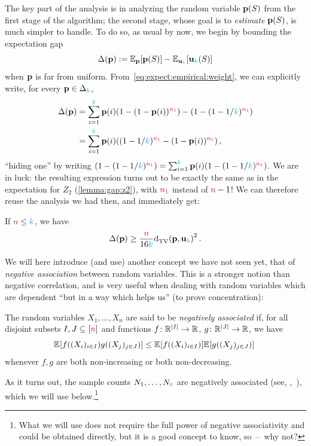 The key part of the analysis is in analyzing the random variable $\mathbf{p}(S)$ from the first stage of the algorithm; the second stage, whose goal is to \emph{estimate} $\mathbf{p}(S)$, is much simpler to handle. To do so, as usual by now, we begin by bounding the expectation gap
\begin{equation}
    \Delta(\p) \eqdef \bE{\p}{\p(S)} - \bE{\uniform_\ab}{\uniform_\ab(S)}
\end{equation}
when $\mathbf{p}$ is far from uniform. From~\cref{eq:expect:empirical:weight}, we can explicitly write, for every $\mathbf{p}\in\Delta_{{\textcolor{cyan}{k}}}$,
\begin{align*}
  \Delta(\p) 
  &= \sum_{i=1}^\ab \p(i) (1-(1-\p(i))^{\nss}) - \Paren{1-(1-1/\ab)^{\nss}} \\
  &= \sum_{i=1}^\ab \p(i) \Paren{ (1-1/\ab)^{\nss} - (1-\p(i))^{\nss} }\,,
\end{align*}
``hiding one'' by writing $\Paren{1-(1-1/\ab)^{\nss}} = \sum_{i=1}^\ab \p(i)\Paren{1-(1-1/\ab)^{\nss}}$. We are in luck: the resulting expression turns out to be exactly the same as in the expectation for $Z_2$ (\cref{lemma:gap:z2}), with $\textcolor{red}{{\textcolor{purple}{n}}_1}$ instead of ${\textcolor{purple}{n}}-1$! We can therefore reuse the analysis we had then, and immediately get:
\begin{lemma}
  \label{lemma:gap:z7}
If ${\textcolor{purple}{n}} \leq {\textcolor{cyan}{k}}$, we have
\[
    \Delta(\p) \geq \frac{\ns}{16\ab}\totalvardist{\p}{\uniform_\ab}^2\,.
\]
\end{lemma}
We will here introduce (and use) another concept we have not seen yet, that of \emph{negative association} between random variables. This is a stronger notion than negative correlation, and is very useful when dealing with random variables which are dependent ``but in a way which helps us'' (to prove concentration):
\begin{definition}
The random variables $X_1,\dots, X_n$ are said to be \emph{negatively associated} if, for all disjoint subsets $I,J\subseteq [{\textcolor{purple}{n}}]$ and functions $f\colon \mathbb{R}^{|I|} \to \mathbb{R}$, $g\colon \mathbb{R}^{|J|} \to \mathbb{R}$, we have
\[
    \bEE{f((X_i)_{i\in I})g((X_j)_{j\in J})} \leq \bEE{f((X_i)_{i\in I})}\bEE{g((X_j)_{j\in J})} \
\]
whenever $f,g$ are both non-increasing or both non-decreasing. 
\end{definition}
As it turns out, the sample counts $N_1,\dots,N_{\textcolor{cyan}{k}}$ are negatively associated (see, \eg,~\citep[Section~2.2]{DubhashiR98}), which we will use below.\footnote{What we will use does not require the full power of negative associativity and could be obtained directly, but it is a good concept to know, so~--~why not?} 
